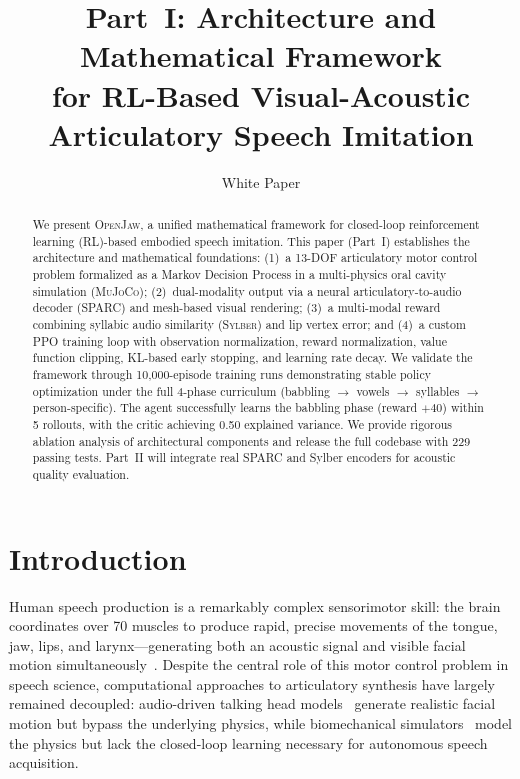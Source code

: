 \documentclass[11pt, a4paper]{article}
\title{\openjaw{} Part~I: Architecture and Mathematical Framework\\for RL-Based Visual-Acoustic Articulatory Speech Imitation}
\author{\large White Paper}
\newcommand{\openjaw}{\textsc{OpenJaw}}
\newcommand{\sparc}{\textsc{SPARC}}
\newcommand{\sylber}{\textsc{Sylber}}
\newcommand{\mujoco}{\textsc{MuJoCo}}
\begin{document}
\maketitle

\begin{abstract}
We present \openjaw{}, a unified mathematical framework for closed-loop reinforcement learning (RL)-based embodied speech imitation. This paper (Part~I) establishes the architecture and mathematical foundations: (1)~a 13-DOF articulatory motor control problem formalized as a Markov Decision Process in a multi-physics oral cavity simulation (\mujoco{}); (2)~dual-modality output via a neural articulatory-to-audio decoder (\sparc{}) and mesh-based visual rendering; (3)~a multi-modal reward combining syllabic audio similarity (\sylber{}) and lip vertex error; and (4)~a custom PPO training loop with observation normalization, reward normalization, value function clipping, KL-based early stopping, and learning rate decay. We validate the framework through 10,000-episode training runs demonstrating stable policy optimization under the full 4-phase curriculum (babbling $\to$ vowels $\to$ syllables $\to$ person-specific). The agent successfully learns the babbling phase (reward $+40$) within 5 rollouts, with the critic achieving 0.50 explained variance. We provide rigorous ablation analysis of architectural components and release the full codebase with 229 passing tests. Part~II will integrate real SPARC and Sylber encoders for acoustic quality evaluation.
\end{abstract}

\section{Introduction}
\label{sec:introduction}

Human speech production is a remarkably complex sensorimotor skill: the brain coordinates over 70 muscles to produce rapid, precise movements of the tongue, jaw, lips, and larynx---generating both an acoustic signal and visible facial motion simultaneously~\cite{maeda2004compensatory}. Despite the central role of this motor control problem in speech science, computational approaches to articulatory synthesis have largely remained decoupled: audio-driven talking head models~\cite{richard2021selftalk, fan2022faceformer, xing2023codetalker} generate realistic facial motion but bypass the underlying physics, while biomechanical simulators~\cite{freeman2023artisynth, tian2019vocaltractlab} model the physics but lack the closed-loop learning necessary for autonomous speech acquisition.
\end{document}
